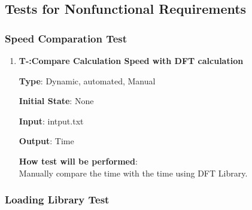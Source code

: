 \documentclass[12pt, titlepage]{article}
\newcounter{tnum}
\begin{document}
\subsection{Tests for Nonfunctional Requirements}

\subsubsection{Speed Comparation Test}
\begin{enumerate}

\item{\textbf{T-\thetnum \label{R3RIFFT}:Compare Calculation Speed with DFT calculation}}

\textbf {Type}: Dynamic, automated, Manual
					
\textbf {Initial State}: None
					
\textbf {Input}: intput.txt
					
\textbf {Output}: Time
					
\textbf {How test will be performed}: \\
Manually compare the time with the time using DFT Library.

\end{enumerate}

\subsubsection{Loading Library Test}
\end{document}
